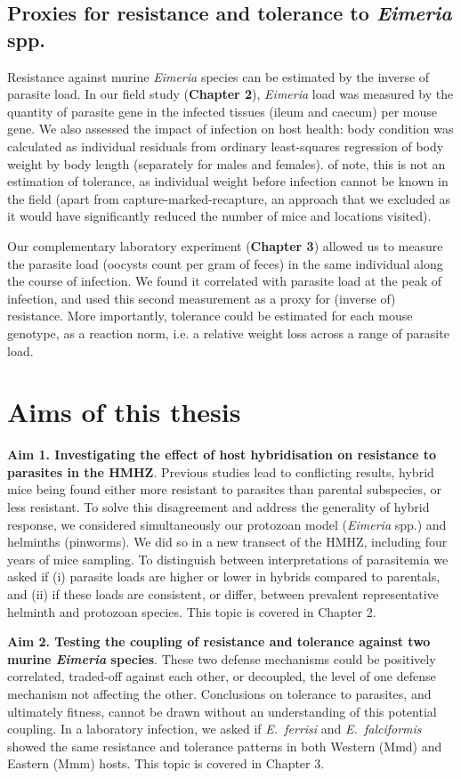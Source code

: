 \subsection{Proxies for resistance and tolerance to \textit{Eimeria} spp.}
Resistance against murine \textit{Eimeria} species can be estimated by the inverse of parasite load. In our field study (\textbf{Chapter 2}), \textit{Eimeria} load was measured by the quantity of parasite gene in the infected tissues (ileum and caecum) per mouse gene. We also assessed the impact of infection on host health: body condition was calculated as individual residuals from ordinary least-squares regression of body weight by body length (separately for males and females). of note, this is not an estimation of tolerance, as individual weight before infection cannot be known in the field (apart from capture-marked-recapture, an approach that we excluded as it would have significantly reduced the number of mice and locations visited). 
\par
Our complementary laboratory experiment (\textbf{Chapter 3}) allowed us to measure the parasite load (oocysts count per gram of feces) in the same individual along the course of infection. We found it correlated with parasite load at the peak of infection, and used this second measurement as a proxy for (inverse of) resistance. More importantly, tolerance could be estimated for each mouse genotype, as a reaction norm, i.e. a relative weight loss across a range of parasite load. 
\section{Aims of this thesis}
\textbf{Aim 1. Investigating the effect of host hybridisation on resistance to parasites in the HMHZ}. Previous studies lead to conflicting results, hybrid mice being found either more resistant to parasites than parental subspecies, or less resistant. To solve this disagreement and address the generality of hybrid response, we considered simultaneously our protozoan model (\textit{Eimeria} spp.) and helminths (pinworms). We did so in a new transect of the HMHZ, including four years of mice sampling. To distinguish between interpretations of parasitemia we asked if (i) parasite loads are higher or lower in hybrids compared to parentals, and (ii) if these loads are consistent, or differ, between prevalent representative helminth and protozoan species. This topic is covered in Chapter 2.
\par
\textbf{Aim 2. Testing the coupling of resistance and tolerance against two murine \textit{Eimeria} species}. These two defense mechanisms could be positively correlated, traded-off against each other, or decoupled, the level of one defense mechanism not affecting the other. Conclusions on tolerance to parasites, and ultimately fitness, cannot be drawn without an understanding of this potential coupling. In a laboratory infection, we asked if \textit{E.~ferrisi} and \textit{E.~falciformis} showed the same resistance and tolerance patterns in both Western (Mmd) and Eastern (Mmm) hosts. This topic is covered in Chapter 3. 
